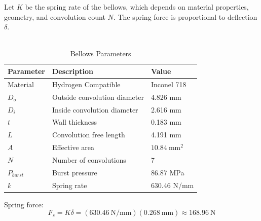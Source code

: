 \documentclass[12pt, letterpaper]{report}%
\begin{document}
            Let $K$ be the spring rate of the bellows, which depends on material properties, geometry, and convolution count $N$.
            The spring force is proportional to deflection $\delta$.
            \\~\\

            \begin{table}[H]
                \centering
                \caption{Bellows Parameters}
                \label{tab:bellows_parameters}
                \begin{tabularx}{\textwidth}{l X l}
                    \toprule
                    \textbf{Parameter} & \textbf{Description} & \textbf{Value} \\
                    \midrule
                    Material &
                    Hydrogen Compatible &
                    Inconel 718
                        \\\addlinespace
                    $D_o$ &
                    Outside convolution diameter &
                    4.826 mm
                    \\\addlinespace
                    $D_i$ &
                    Inside convolution diameter &
                    2.616 mm
                    \\\addlinespace
                    $t$ &
                    Wall thickness &
                    0.183 mm
                    \\\addlinespace
                    $L$ &
                    Convolution free length &
                    4.191 mm
                    \\\addlinespace
                    $A$ &
                    Effective area &
                    $10.84 \ \text{mm}^2$
                        \\\addlinespace
                    $N$ &
                    Number of convolutions &
                    7
                    \\\addlinespace
                    $P_{burst}$ &
                    Burst pressure &
                    86.87 MPa
                    \\\addlinespace
                    $k$ &
                    Spring rate &
                    630.46 N/mm
                    \\\bottomrule
                \end{tabularx}
            \end{table}

            Spring force:
            \begin{equation}
            F_s = K \delta = (630.46 \ \text{N/mm})(0.268 \ \text{mm}) \approx 168.96 \ \text{N}
            \label{force_spring}    
            \end{equation}
\end{document}

